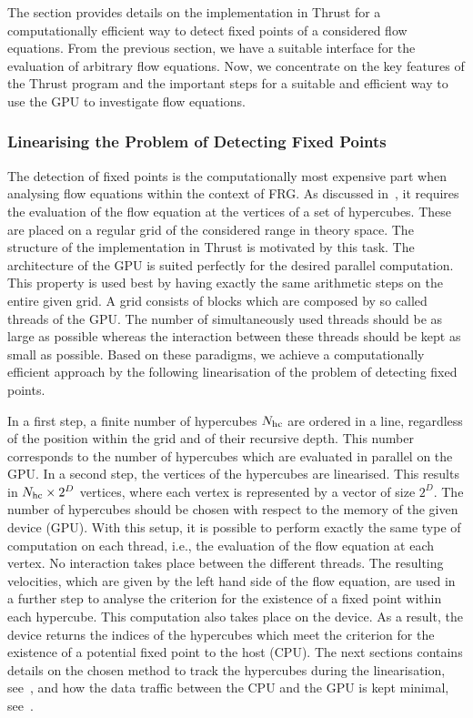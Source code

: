 \documentclass[paper=a4,11pt,bibliography=totoc]{scrartcl}
\begin{document}
The section provides details on the implementation in Thrust for a computationally efficient way to detect fixed points of a considered flow equations. From the previous section, we have a suitable interface for the evaluation of arbitrary flow equations. Now, we concentrate on the key features of the Thrust program and the important steps for a suitable and efficient way to use the GPU to investigate flow equations.

\subsubsection{Linearising the Problem of Detecting Fixed Points}

The detection of fixed points is the computationally most expensive part when analysing flow equations within the context of FRG. As discussed in~, it requires the evaluation of the flow equation at the vertices of a set of hypercubes. These are placed on a regular grid of the considered range in theory space. The structure of the implementation in Thrust is motivated by this task. The architecture of the GPU is suited perfectly for the desired parallel computation. This property is used best by having exactly the same arithmetic steps on the entire given grid. A grid consists of blocks which are composed by so called threads of the GPU. The number of simultaneously used threads should be as large as possible whereas the interaction between these threads should be kept as small as possible. Based on these paradigms, we achieve a computationally efficient approach by the following linearisation of the problem of detecting fixed points.

In a first step, a finite number of hypercubes $N_{\textnormal{hc}}$ are ordered in a line, regardless of the position within the grid and of their recursive depth. This number corresponds to the number of hypercubes which are evaluated in parallel on the GPU. In a second step, the vertices of the hypercubes are linearised. This results in $N_{\textnormal{hc}}\times 2^D$ vertices, where each vertex is represented by a vector of size $2^D$. The number of hypercubes should be chosen with respect to the memory of the given device (GPU). With this setup, it is possible to perform exactly the same type of computation on each thread, i.e., the evaluation of the flow equation at each vertex. No interaction takes place between the different threads. The resulting velocities, which are given by the left hand side of the flow equation, are used in a further step to analyse the criterion for the existence of a fixed point within each hypercube. This computation also takes place on the device. As a result, the device returns the indices of the hypercubes which meet the criterion for the existence of a potential fixed point to the host (CPU). The next sections contains details on the chosen method to track the hypercubes during the linearisation, see~, and how the data traffic between the CPU and the GPU is kept minimal, see~.
\end{document}
